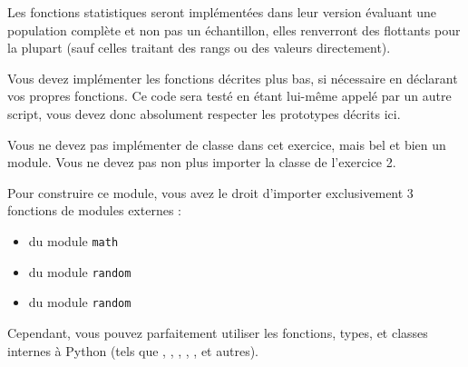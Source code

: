 

\vspace*{0.7cm}

\noindent {}

\noindent Les fonctions statistiques seront implémentées dans leur version évaluant une population complète et non pas un échantillon, elles renverront des flottants pour la plupart (sauf celles traitant des rangs ou des valeurs directement).

\bigskip

\noindent Vous devez implémenter les fonctions décrites plus bas, si nécessaire en déclarant vos propres fonctions.
Ce code sera testé en étant lui-même appelé par un autre script, vous devez donc absolument respecter les prototypes décrits ici.

\bigskip

\noindent Vous ne devez pas implémenter de classe dans cet exercice, mais bel et bien un module.
Vous ne devez pas non plus importer la classe de l'exercice 2.

\bigskip

\noindent Pour construire ce module, vous avez le droit d'importer exclusivement 3 fonctions de modules externes :

\begin{itemize}
\item {} du module \texttt{math}
\item {} du module \texttt{random}
\item {} du module \texttt{random}
\end{itemize}

\bigskip

\noindent Cependant, vous pouvez parfaitement utiliser les fonctions, types, et classes internes à Python (tels que , , , , , et autres).

